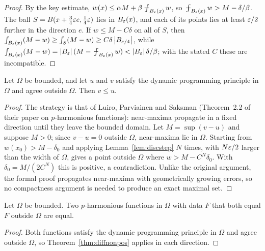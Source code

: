 \begin{proof}
\leanok
{}
By the key estimate, $w(x) \le \alpha M + \beta \avgint_{B_\eps(x)} w$, so
$\avgint_{B_\eps(x)} w > M - \delta/\beta$. The ball
$S = B(x + \frac34\varepsilon e, \frac14\varepsilon)$ lies in $B_\varepsilon(x)$, and each of its
points lies at least $\varepsilon/2$ further in the direction $e$. If $w \le M - C\delta$
on all of $S$, then $\int_{B_\varepsilon(x)}(M - w) \ge \int_S (M - w)
\ge C\delta\left\lvert B_{\varepsilon/4}\right\rvert$, while $\int_{B_\eps(x)}(M - w)
= \abs{B_\eps}(M - \avgint_{B_\eps(x)} w) < \abs{B_\eps}\delta/\beta$; with the
stated $C$ these are incompatible.
\end{proof}

\begin{theorem}\label{thm:diffnonpos}
\leanok
{}
Let $\Omega$ be bounded, and let $u$ and $v$ satisfy the dynamic programming
principle in $\Omega$ and agree outside $\Omega$. Then $v \le u$.
\end{theorem}

\begin{proof}
\leanok
{}
The strategy is that of Luiro, Parviainen and Saksman (Theorem~2.2 of their
paper on $p$-harmonious functions): near-maxima propagate in a fixed direction
until they leave the bounded domain. Let $M = \sup(v - u)$ and suppose $M > 0$;
since $v - u = 0$ outside $\Omega$, near-maxima lie in $\Omega$. Starting from
$w(x_0) > M - \delta_0$ and applying Lemma~\ref{lem:discstep} $N$ times, with
$N\varepsilon/2$ larger than the width of $\Omega$, gives a point outside $\Omega$ where
$w > M - C^N\delta_0$. With $\delta_0 = M/(2C^N)$ this is positive, a
contradiction. Unlike the original argument, the formal proof propagates
near-maxima with geometrically growing errors, so no compactness argument is
needed to produce an exact maximal set.
\end{proof}

\begin{theorem}\label{thm:discunique}
\leanok
{}
Let $\Omega$ be bounded. Two $p$-harmonious functions in $\Omega$ with data $F$
that both equal $F$ outside $\Omega$ are equal.
\end{theorem}

\begin{proof}
\leanok
{}
Both functions satisfy the dynamic programming principle in $\Omega$ and agree
outside $\Omega$, so Theorem~\ref{thm:diffnonpos} applies in each direction.
\end{proof}

